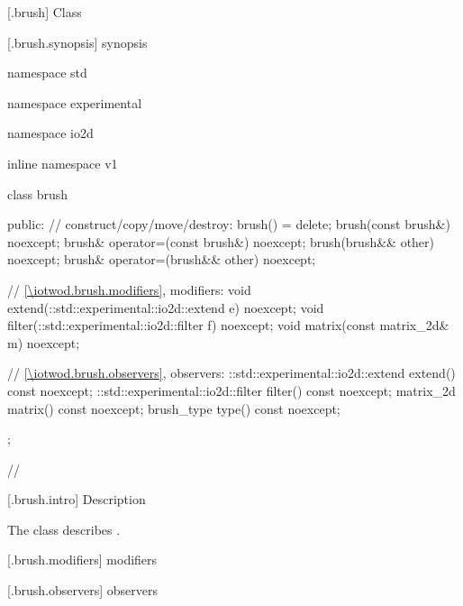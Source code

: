  [\iotwod.brush] {Class }

 [\iotwod.brush.synopsis] { synopsis}

\begin{codeblock}
namespace std { namespace experimental { namespace io2d { inline namespace v1 {
  class brush {
  public:
    // construct/copy/move/destroy:
    brush() = delete;
    brush(const brush&) noexcept;
    brush& operator=(const brush&) noexcept;
    brush(brush&& other) noexcept;
    brush& operator=(brush&& other) noexcept;

    // \ref{\iotwod.brush.modifiers}, modifiers:
    void extend(::std::experimental::io2d::extend e) noexcept;
    void filter(::std::experimental::io2d::filter f) noexcept;
    void matrix(const matrix_2d& m) noexcept;

    // \ref{\iotwod.brush.observers}, observers:
    ::std::experimental::io2d::extend extend() const noexcept;
    ::std::experimental::io2d::filter filter() const noexcept;
    matrix_2d matrix() const noexcept;
    brush_type type() const noexcept;
  };

    
    
// \expos
  
} } } }
\end{codeblock}

 [\iotwod.brush.intro] { Description}

\pnum
{}
The class  describes .

 [\iotwod.brush.modifiers]{ modifiers}

\begin{itemdecl}
\end{itemdecl}
\begin{itemdescr}
	\pnum
	\postconditions
	
\end{itemdescr}

 [\iotwod.brush.observers]{ observers}

\begin{itemdecl}
\end{itemdecl}
\begin{itemdescr}
	\pnum
	\returns

\end{itemdescr}

